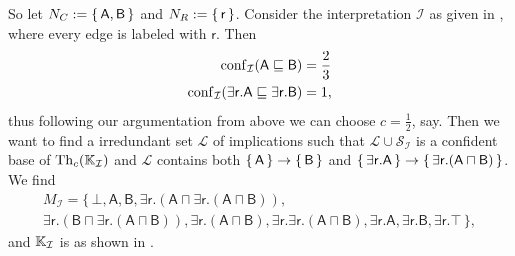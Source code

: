 \begin{Example}
  So let $N_C := {\{\, \mathsf{A}, \mathsf{B} \,\}}$ and $N_R := {\{\, \mathsf{r} \,\}}$.
  Consider the interpretation $\mathcal{I}$ as given in
  , where every edge is labeled with $\mathsf{r}$.  Then
  \begin{align*}
    \operatorname{conf}_{\mathcal{I}}(\mathsf{A} \sqsubseteq \mathsf{B}) &= \frac 2 3\\
    \operatorname{conf}_{\mathcal{I}}(\mathsf{\exists r. A} \sqsubseteq \mathsf{\exists r. B}) &= 1,
  \end{align*}
  thus following our argumentation from above we can choose $c = \frac 1 2$, say.  Then we
  want to find a irredundant set $\mathcal{L}$ of implications such that $\mathcal{L} \cup
  \mathcal{S}_{\mathcal{I}}$ is a confident base of $\operatorname{Th}_c({\mathbb{K}}_{\mathcal{I}})$ and
  $\mathcal{L}$ contains both ${\{\, \mathsf{A} \,\}} \to {\ensuremath{\{\, \mathsf{B} \,\}}}$ and ${\{\,
    \mathsf{\exists r. A} \,\}} \to {\ensuremath{\{\, \mathsf{\exists r. (A \sqcap B)} \,\}}}$.  We find
  \begin{multline*}
    M_{\mathcal{I}} = \{\, \mathsf{ \bot, A, B, \exists r.(A \sqcap \exists r.(A \sqcap B)), }\\
    \mathsf{ \exists r.(B \sqcap \exists r.(A \sqcap B)), \exists r.(A \sqcap B), \exists
    r.\exists r.(A \sqcap B), \exists r.A, \exists r.B, \exists r.\top } \,\},
  \end{multline*}
  and ${\mathbb{K}}_{\mathcal{I}}$ is as shown in
  .


\end{Example}
